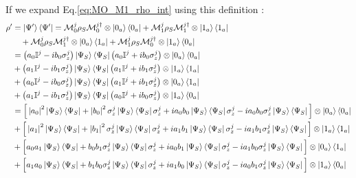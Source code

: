 \documentclass[a4paper,12pt]{article}
\begin{document}
If we expand Eq.\ref{eq:MO_M1_rho_int} using this definition :
\begin{align}
	\rho' &= \ket{\Psi'}\bra{\Psi'} = \mathcal{M}_{0}^{j} \rho_S \mathcal{M}_{0}^{j \dagger} \otimes \ket{0_a}\bra{0_a} + \mathcal{M}_{1}^{j} \rho_S \mathcal{M}_{1}^{j \dagger} \otimes \ket{1_a} \bra{1_a} \notag \\
	& \quad + \mathcal{M}_{0}^{j} \rho_S \mathcal{M}_{1}^{j \dagger} \otimes \ket{0_a} \bra{1_a} + \mathcal{M}_{1}^{j} \rho_S \mathcal{M}_{0}^{j \dagger} \otimes \ket{1_a} \bra{0_a} \notag \\
	& = \left(a_{0} \mathbb{I}^{j} - i b_{0} \sigma_{z}^{j}\right) \ket{\Psi_{S}}\bra{\Psi_{S}} \left(a_{0} \mathbb{I}^{j} + i b_{0} \sigma_{z}^{j}\right) \otimes \ket{0_{a}} \bra{0_{a}} \notag \\
	& + \left(a_{1} \mathbb{I}^{j} - i b_{1} \sigma_{z}^{j}\right) \ket{\Psi_{S}}\bra{\Psi_{S}} \left(a_{1} \mathbb{I}^{j} + i b_{1} \sigma_{z}^{j}\right) \otimes \ket{1_{a}} \bra{1_{a}} \notag \\
	& + \left(a_{0} \mathbb{I}^{j} - i b_{0} \sigma_{z}^{j}\right) \ket{\Psi_{S}}\bra{\Psi_{S}} \left(a_{1} \mathbb{I}^{j} + i b_{1} \sigma_{z}^{j}\right) \otimes \ket{0_{a}} \bra{1_{a}} \notag \\
	& + \left(a_{1} \mathbb{I}^{j} - i b_{1} \sigma_{z}^{j}\right) \ket{\Psi_{S}}\bra{\Psi_{S}} \left(a_{0} \mathbb{I}^{j} + i b_{0} \sigma_{z}^{j}\right) \otimes \ket{1_{a}} \bra{0_{a}} \notag \\
	& = \Big[ \left|a_{0}\right|^{2} \ket{\Psi_{S}}\bra{\Psi_{S}} + \left|b_{0}\right|^{2} \sigma_{z}^{j}\ket{\Psi_{S}}\bra{\Psi_{S}}\sigma_{z}^{j} + i a_{0}b_{0}\ket{\Psi_{S}}\bra{\Psi_{S}}\sigma_{z}^{j} -  i a_{0}b_{0} \sigma_{z}^{j} \ket{\Psi_{S}}\bra{\Psi_{S}} \Big] \otimes \ket{0_{a}} \bra{0_{a}} \notag \\
	& + \Big[ \left|a_{1}\right|^{2} \ket{\Psi_{S}}\bra{\Psi_{S}} + \left|b_{1}\right|^{2} \sigma_{z}^{j}\ket{\Psi_{S}}\bra{\Psi_{S}}\sigma_{z}^{j} + i a_{1}b_{1}\ket{\Psi_{S}}\bra{\Psi_{S}}\sigma_{z}^{j} -  i a_{1}b_{1} \sigma_{z}^{j} \ket{\Psi_{S}}\bra{\Psi_{S}} \Big] \otimes \ket{1_{a}} \bra{1_{a}} \notag \\
	& + \Big[ a_{0} a_{1} \ket{\Psi_{S}}\bra{\Psi_{S}} + b_{0} b_{1}  \sigma_{z}^{j}\ket{\Psi_{S}}\bra{\Psi_{S}}\sigma_{z}^{j} + i a_{0}b_{1}\ket{\Psi_{S}}\bra{\Psi_{S}}\sigma_{z}^{j} -  i a_{1}b_{0} \sigma_{z}^{j} \ket{\Psi_{S}}\bra{\Psi_{S}} \Big] \otimes \ket{0_{a}} \bra{1_{a}} \notag \\
	& + \Big[ a_{1} a_{0} \ket{\Psi_{S}}\bra{\Psi_{S}} + b_{1} b_{0}  \sigma_{z}^{j}\ket{\Psi_{S}}\bra{\Psi_{S}}\sigma_{z}^{j} + i a_{1}b_{0}\ket{\Psi_{S}}\bra{\Psi_{S}}\sigma_{z}^{j} -  i a_{0}b_{1} \sigma_{z}^{j} \ket{\Psi_{S}}\bra{\Psi_{S}} \Big] \otimes \ket{1_{a}} \bra{0_{a}} \notag
\end{align}
\end{document}
